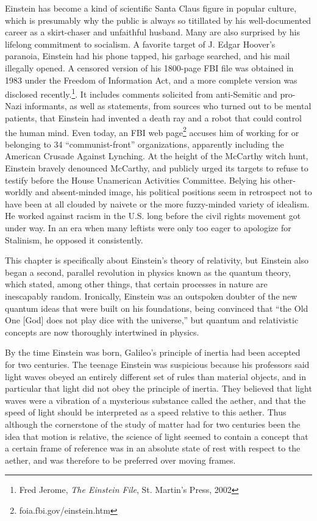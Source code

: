 Einstein has become a kind of scientific Santa Claus figure
in popular culture, which is presumably why the public is always
so titillated by his well-documented career as a skirt-chaser
and unfaithful husband. Many are also surprised by his lifelong
commitment to socialism. A favorite target of J. Edgar Hoover's
paranoia, Einstein had his phone tapped, his garbage searched, and
his mail illegally opened. A censored version of his 1800-page FBI
file was obtained in 1983 under the Freedom of Information Act,
and a more complete version was disclosed recently.\footnote{Fred Jerome,
\emph{The Einstein File}, St. Martin's Press, 2002}. It includes comments solicited from
anti-Semitic and pro-Nazi informants, as well as statements, from sources
who turned out to be mental patients, that Einstein had invented a death ray
and a robot that could control the human mind. Even today, an FBI
web page\footnote{foia.fbi.gov/einstein.htm} accuses him of working for or belonging to 34 ``communist-front''
organizations, apparently including the American Crusade Against Lynching.
At the height of the McCarthy witch hunt, Einstein bravely denounced McCarthy,
and publicly urged its targets to refuse to testify before the House Unamerican
Activities Committee.
Belying his other-worldly and absent-minded image, his political positions
seem in retrospect not to have been at all clouded by naivete or the more fuzzy-minded variety of idealism.
He worked against racism in the U.S. long before the civil rights movement got under way.
In an era when many leftists were only too eager to
apologize for Stalinism, he opposed it consistently.

This chapter is specifically about Einstein's
theory of relativity, but Einstein also began a second,
parallel revolution in physics known as the quantum theory,
which stated, among other things, that certain processes in
nature are inescapably random. Ironically, Einstein was an
outspoken doubter of the new quantum ideas that were
built on his foundations, being convinced
that ``the Old One [God] does not play dice with the
universe,'' but quantum and relativistic concepts are now
thoroughly intertwined in physics.

By the time Einstein was born, Galileo's principle of
inertia had been accepted for two centuries.
The teenage Einstein was
suspicious because his professors said light waves obeyed an
entirely different set of rules than material objects, and in particular
that light did not obey the principle of inertia. They
believed that light waves were a vibration of a mysterious
substance called the aether, and that the speed of light should
be interpreted as a speed relative to this aether.  Thus although the
cornerstone of the study of matter had for two centuries
been the idea that motion is relative, the science of light
seemed to contain a concept that a certain frame of reference
was in an absolute state of rest with respect to the aether,
and was therefore to be preferred over moving frames.

